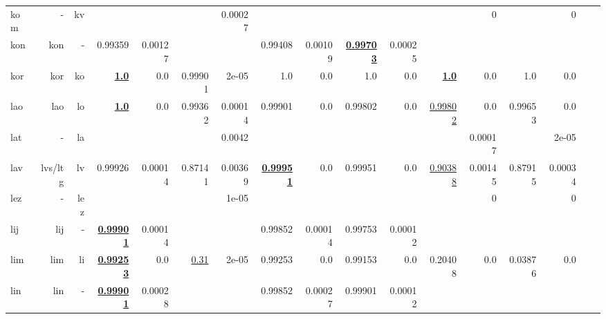 \documentclass[11pt]{article}
\begin{document}
\begin{table*}[h]
{\begin{tabular}{lrrrrrrrrrrrrrrrr}
kom         & -         & kv         &          &          &          & 0.00027         &          &          &          &          &          & 0         &          & 0         \\
kon         & kon         & -         & 0.99359         & 0.00127         &          &          & 0.99408         & 0.00109         & \textbf{\underline{0.99703}}         & 0.00025         &          &          &          &          \\
kor         & kor         & ko         & \textbf{\underline{1.0}}         & 0.0         & 0.99901         & 2e-05         & 1.0         & 0.0         & 1.0         & 0.0         & \textbf{\underline{1.0}}         & 0.0         & 1.0         & 0.0         \\
lao         & lao         & lo         & \textbf{\underline{1.0}}         & 0.0         & 0.99362         & 0.00014         & 0.99901         & 0.0         & 0.99802         & 0.0         & \underline{0.99802}         & 0.0         & 0.99653         & 0.0         \\
lat         & -         & la         &          &          &          & 0.0042         &          &          &          &          &          & 0.00017         &          & 2e-05         \\
lav         & lvs/ltg         & lv         & 0.99926         & 0.00014         & 0.87141         & 0.00369         & \textbf{\underline{0.99951}}         & 0.0         & 0.99951         & 0.0         & \underline{0.90388}         & 0.00145         & 0.87915         & 0.00034         \\
lez         & -         & lez         &          &          &          & 1e-05         &          &          &          &          &          & 0         &          & 0         \\
lij         & lij         & -         & \textbf{\underline{0.99901}}         & 0.00014         &          &          & 0.99852         & 0.00014         & 0.99753         & 0.00012         &          &          &          &          \\
lim         & lim         & li         & \textbf{\underline{0.99253}}         & 0.0         & \underline{0.31}         & 2e-05         & 0.99253         & 0.0         & 0.99153         & 0.0         & 0.20408         & 0.0         & 0.03876         & 0.0         \\
lin         & lin         & -         & \textbf{\underline{0.99901}}         & 0.00028         &          &          & 0.99852         & 0.00027         & 0.99901         & 0.00012         &          &          &          &          \\

\end{tabular}}
\end{table*}
\end{document}
